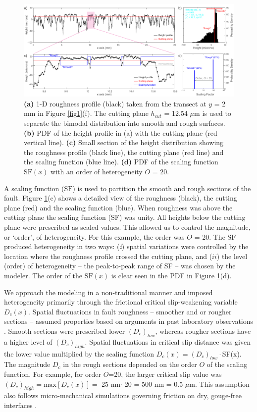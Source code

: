 \documentclass[preprint,1p, 10pt,authoryear]{elsarticle}
\begin{document}
\begin{figure}[ht]
	\centering
	\includegraphics{FIG3_revised.pdf} 
	\caption{ \textbf{(a)} 1-D roughness profile (black) taken from the transect at $y$ = 2 mm in Figure \ref{fig1}(f).  The cutting plane $h_{cut}$ = 12.54 $\mu$m is used to separate the bimodal distribution into smooth and rough surfaces. \textbf{(b)} PDF of the height profile in (a) with the cutting plane (red vertical line). \textbf{(c)} Small section of the height distribution showing the roughness profile (black line), the cutting plane (red line) and the scaling function (blue line). \textbf{(d)} PDF of the scaling function $\mathrm{SF}(x)$ with an order of heterogeneity $O$ = 20.}
	\label{fig3}
\end{figure}

A scaling function ($\mathrm{SF}$) is used to partition the smooth and rough sections of the fault. Figure \ref{fig3}(c) shows a detailed view of the roughness (black), the cutting plane (red) and the scaling function (blue). When roughness was above the cutting plane the scaling function ($\mathrm{SF}$) was unity. All heights below the cutting plane were prescribed as scaled values. This allowed us to control the magnitude, or `order', of heterogeneity. For this example, the order was $O$ = 20. The  $\mathrm{SF}$ produced heterogeneity in two ways: (\textit{i}) spatial variations were controlled by the location where the roughness profile crossed the cutting plane, and ($ii$) the level (order) of heterogeneity -- the peak-to-peak range of SF -- was chosen by the modeler. The order of the $\mathrm{SF}(x)$ is clear seen in the PDF in Figure \ref{fig3}(d).

We approach the modeling in a non-traditional manner and imposed heterogeneity primarily through the frictional critical slip-weakening variable $D_{c}(x)$. Spatial fluctuations in fault roughness -- smoother and or rougher sections -- assumed properties based on arguments in past laboratory observations \citep{Marone1994}. Smooth sections were prescribed lower $(D_{c})_{low}$, whereas rougher sections have a higher level of $(D_{c})_{high}$. Spatial fluctuations in critical slip distance was given the lower value multiplied by the scaling function $D_{c}(x) = (D_{c})_{low}\cdot$SF(x). The magnitude $D_{c}$ in the rough sections depended on the order $O$ of the scaling function. For example, for order $O$=20, the larger critical slip value was $(D_{c})_{high} = \textrm{max}[D_{c}(x)] =$ 25 nm$\cdot$ 20 = 500 nm = 0.5 $\mu$m. This assumption also follows micro-mechanical simulations governing friction on dry, gouge-free interfaces \citep{Yoshioka1996,Yoshioka1997}. 
\end{document}
